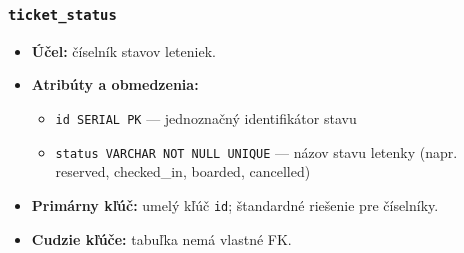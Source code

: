 \documentclass[11pt, a4paper]{article}
\begin{document}
\subsubsection*{\texttt{ticket\_status}}
\begin{itemize}
    \item \textbf{Účel:} číselník stavov leteniek.
    \item \textbf{Atribúty a obmedzenia:}
    \begin{itemize}
        \item \texttt{id SERIAL PK} --- jednoznačný identifikátor stavu
        \item \texttt{status VARCHAR NOT NULL UNIQUE} --- názov stavu letenky (napr. reserved, checked\_in, boarded, cancelled)
    \end{itemize}
    \item \textbf{Primárny kľúč:} umelý kľúč \texttt{id}; štandardné riešenie pre číselníky.
    \item \textbf{Cudzie kľúče:} tabuľka nemá vlastné FK.
\end{itemize}
\end{document}
